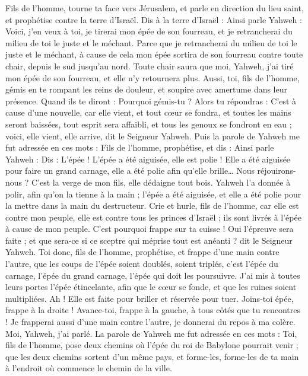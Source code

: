 \begin{multicols}{2}
Fils de l’homme, tourne ta face vers Jérusalem, et parle en direction du lieu saint, et prophétise contre la terre d'Israël.
Dis à la terre d'Israël : Ainsi parle Yahweh : Voici, j'en veux à toi, je tirerai mon épée de son fourreau, et je retrancherai du milieu de toi le juste et le méchant.
Parce que je retrancherai du milieu de toi le juste et le méchant, à cause de cela mon épée sortira de son fourreau contre toute chair, depuis le sud jusqu'au nord.
Toute chair saura que moi, Yahweh, j'ai tiré mon épée de son fourreau, et elle n'y retournera plus.
Aussi, toi, fils de l’homme, gémis en te rompant les reins de douleur, et soupire avec amertume dans leur présence.
Quand ils te diront : Pourquoi gémis-tu ? Alors tu répondras : C'est à cause d’une nouvelle, car elle vient, et tout cœur se fondra, et toutes les mains seront baissées, tout esprit sera affaibli, et tous les genoux se fondront en eau ; voici, elle vient, elle arrive, dit le Seigneur Yahweh.
Puis la parole de Yahweh me fut adressée en ces mots :
Fils de l’homme, prophétise, et dis : Ainsi parle Yahweh : Dis : L'épée ! L'épée a été aiguisée, elle est polie !
Elle a été aiguisée pour faire un grand carnage, elle a été polie afin qu'elle brille… Nous réjouirons-nous ? C'est la verge de mon fils, elle dédaigne tout bois.
Yahweh l'a donnée à polir, afin qu'on la tienne à la main ; l'épée a été aiguisée, et elle a été polie pour la mettre dans la main du destructeur.
Crie et hurle, fils de l’homme, car elle est contre mon peuple, elle est contre tous les princes d'Israël ; ils sont livrés à l'épée à cause de mon peuple. C'est pourquoi frappe sur ta cuisse !
Oui l’épreuve sera faite ; et que sera-ce si ce sceptre qui méprise tout est anéanti ? dit le Seigneur Yahweh.
Toi donc, fils de l’homme, prophétise, et frappe d'une main contre l'autre, que les coups de l'épée soient doublés, soient triplés, c’est l’épée du carnage, l’épée du grand carnage, l’épée qui doit les poursuivre.
J'ai mis à toutes leurs portes l'épée étincelante, afin que le cœur se fonde, et que les ruines soient multipliées. Ah ! Elle est faite pour briller et réservée pour tuer.
Joins-toi épée, frappe à la droite ! Avance-toi, frappe à la gauche, à tous côtés que tu rencontres !
Je frapperai aussi d'une main contre l'autre, je donnerai du repos à ma colère. Moi, Yahweh, j'ai parlé.
La parole de Yahweh me fut adressée en ces mots :
Toi, fils de l’homme, pose deux chemins où l'épée du roi de Babylone pourrait venir ; que les deux chemins sortent d'un même pays, et forme-les, forme-les de ta main à l'endroit où commence le chemin de la ville.

\end{multicols}
